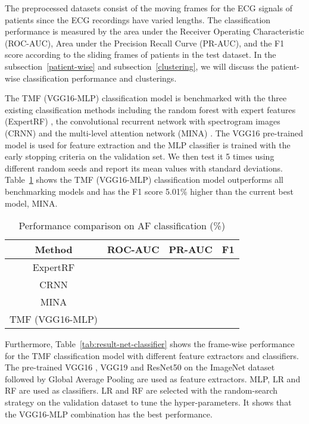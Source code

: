 \documentclass[journal]{IEEEtran}
\begin{document}
The preprocessed datasets consist of the moving frames for the ECG signals of patients since the ECG recordings have varied lengths. 
The classification performance is measured by the area under the Receiver Operating Characteristic (ROC-AUC), Area under the Precision Recall Curve (PR-AUC), and the F1 score according to the sliding frames of patients in the test dataset. In the subsection~\ref{patient-wise} and subsection~\ref{clustering}, we will discuss the patient-wise classification performance and clusterings.

The TMF (VGG16-MLP) classification model is benchmarked with the three existing classification methods including the random forest with expert features (ExpertRF) \cite{mina_2019}, the convolutional recurrent network with spectrogram images (CRNN) \cite{CRNN_ECG_2017} and the multi-level attention network (MINA) \cite{mina_2019}. The VGG16 pre-trained model is used for feature extraction and the MLP classifier is trained with the early stopping criteria on the validation set. We then test it 5 times using different random seeds and report its mean values with standard deviations. 
Table~\ref{tab:result-AF} shows the TMF (VGG16-MLP) classification model outperforms all benchmarking models and has the F1 score 5.01\% higher than the current best model, MINA.

\begin{table}[H]
  \caption{Performance comparison on AF classification (\%)}
  \centering
  \begin{tabular}{cccc}
  \hline
  Method     &   ROC-AUC   &   PR-AUC  & F1  \\ 
  \hline
  ExpertRF   &       &     &   \\
  CRNN       &       &     &   \\
  MINA       &       &     &   \\
  \hline
  TMF (VGG16-MLP) &      &     & \\
  \hline
  \end{tabular}
  \label{tab:result-AF}
\end{table}

Furthermore, Table~\ref{tab:result-net-classifier} shows the frame-wise performance for the TMF classification model with different feature extractors and classifiers. 
The pre-trained VGG16 \cite{vgg_2015}, VGG19 \cite{vgg_2015} and ResNet50 \cite{ResNet_2016} on the ImageNet dataset followed by Global Average Pooling are used as feature extractors. MLP, LR and RF are used as classifiers. 
LR and RF are selected with the random-search strategy on the validation dataset to tune the hyper-parameters. It shows that the VGG16-MLP combination has the best performance.
\end{document}
